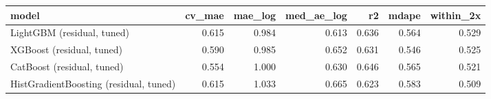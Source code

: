 \begin{tabular}{lrrrrrr}
\toprule
model & cv_mae & mae_log & med_ae_log & r2 & mdape & within_2x \\
\midrule
LightGBM (residual, tuned) & 0.615 & 0.984 & 0.613 & 0.636 & 0.564 & 0.529 \\
XGBoost (residual, tuned) & 0.590 & 0.985 & 0.652 & 0.631 & 0.546 & 0.525 \\
CatBoost (residual, tuned) & 0.554 & 1.000 & 0.630 & 0.646 & 0.565 & 0.521 \\
HistGradientBoosting (residual, tuned) & 0.615 & 1.033 & 0.665 & 0.623 & 0.583 & 0.509 \\
\bottomrule
\end{tabular}
